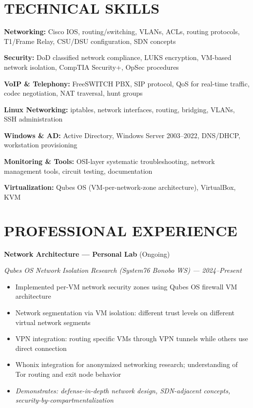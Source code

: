 \documentclass[9pt,letterpaper]{extarticle}
\begin{document}
\section*{TECHNICAL SKILLS}

\noindent\textbf{Networking:} Cisco IOS, routing/switching, VLANs, ACLs, routing protocols, T1/Frame Relay, CSU/DSU configuration, SDN concepts

\noindent\textbf{Security:} DoD classified network compliance, LUKS encryption, VM-based network isolation, CompTIA Security+, OpSec procedures

\noindent\textbf{VoIP \& Telephony:} FreeSWITCH PBX, SIP protocol, QoS for real-time traffic, codec negotiation, NAT traversal, hunt groups

\noindent\textbf{Linux Networking:} iptables, network interfaces, routing, bridging, VLANs, SSH administration

\noindent\textbf{Windows \& AD:} Active Directory, Windows Server 2003--2022, DNS/DHCP, workstation provisioning

\noindent\textbf{Monitoring \& Tools:} OSI-layer systematic troubleshooting, network management tools, circuit testing, documentation

\noindent\textbf{Virtualization:} Qubes OS (VM-per-network-zone architecture), VirtualBox, KVM

\section*{PROFESSIONAL EXPERIENCE}

\noindent\textbf{Network Architecture --- Personal Lab} (Ongoing)

\smallskip\textit{Qubes OS Network Isolation Research (System76 Bonobo WS) --- 2024--Present}
\begin{itemize}
  \item Implemented per-VM network security zones using Qubes OS firewall VM architecture
  \item Network segmentation via VM isolation: different trust levels on different virtual network segments
  \item VPN integration: routing specific VMs through VPN tunnels while others use direct connection
  \item Whonix integration for anonymized networking research; understanding of Tor routing and exit node behavior
  \item \textit{Demonstrates: defense-in-depth network design, SDN-adjacent concepts, security-by-compartmentalization}
\end{itemize}
\end{document}

